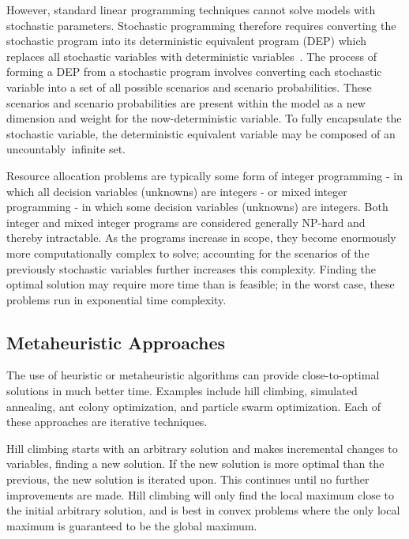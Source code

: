 \documentclass[12pt,dvipsnames]{report}
\begin{document}
However, standard linear programming techniques cannot solve models with stochastic parameters.  Stochastic programming therefore requires converting the stochastic program into its deterministic equivalent program (DEP) which replaces all stochastic variables with deterministic variables~\cite{stochprogramming}.  The process of forming a DEP from a stochastic program involves converting each stochastic variable into a set of all possible scenarios and scenario probabilities.  These scenarios and scenario probabilities are present within the model as a new dimension and weight for the now-deterministic variable.  To fully encapsulate the stochastic variable, the deterministic equivalent variable may be composed of an uncountably~infinite set.

Resource allocation problems are typically some form of integer programming - in which all decision variables (unknowns) are integers - or mixed integer programming - in which some decision variables (unknowns) are integers.  Both integer and mixed integer programs are considered generally NP-hard and thereby intractable.  As the programs increase in scope, they become enormously more computationally complex to solve; accounting for the scenarios of the previously stochastic variables further increases this complexity.  Finding the optimal solution may require more time than is feasible; in the worst case, these problems run in exponential time complexity.

\subsection{Metaheuristic Approaches} \label{subsec:optreview_meta}

The use of heuristic or metaheuristic algorithms can provide close-to-optimal solutions in much better time.  Examples include hill climbing, simulated annealing, ant colony optimization, and particle swarm optimization.  Each of these approaches are iterative techniques.

Hill climbing starts with an arbitrary solution and makes incremental changes to variables, finding a new solution.  If the new solution is more optimal than the previous, the new solution is iterated upon.  This continues until no further improvements are made.  Hill climbing will only find the local maximum close to the initial arbitrary solution, and is best in convex problems where the only local maximum is guaranteed to be the global maximum.
\end{document}
